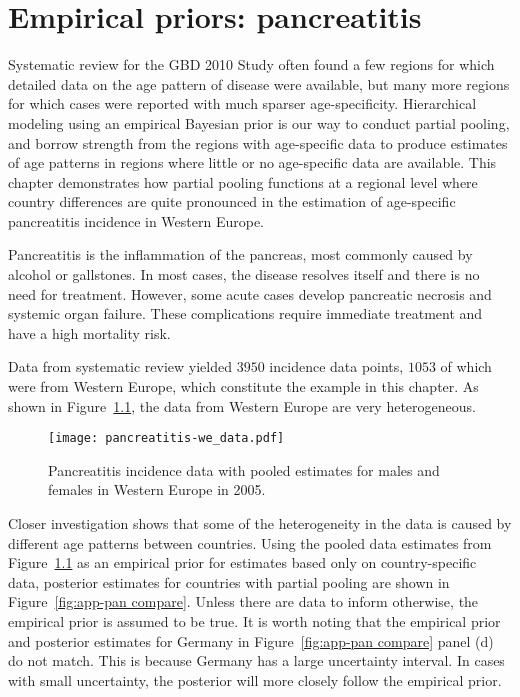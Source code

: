 \chapter{Empirical priors: pancreatitis}
\label{applications-priors_empirical}

Systematic review for the GBD 2010 Study often found a few regions for
which detailed data on the age pattern of disease were available, but
many more regions for which cases were reported with much sparser
age-specificity.  Hierarchical modeling using an empirical Bayesian
prior is our way to conduct partial pooling, and borrow strength from
the regions with age-specific data to produce estimates of age
patterns in regions where little or no age-specific data are available.
This chapter demonstrates how partial pooling functions at a regional level
where country differences are quite pronounced in the estimation of age-specific
pancreatitis incidence in Western Europe.

Pancreatitis is the inflammation of the pancreas, most commonly
caused by alcohol or gallstones.  In most cases, the disease resolves
itself and there is no need for treatment.  However, some acute
cases develop pancreatic necrosis and systemic organ failure.  These
complications require immediate treatment and have a high mortality risk.
\cite{raraty_acute_2004, banks_epidemiology_2002, sekimoto_JPN_2006}

Data from systematic review yielded $3950$ incidence data points,
$1053$ of which were from Western Europe, which constitute the example
in this chapter.  As shown in Figure~\ref{fig:app-pan data}, the data
from Western Europe are very heterogeneous.

    \begin{figure}[h]
        \begin{center}
            \texttt{[image: pancreatitis-we\_data.pdf]}
            \caption{Pancreatitis incidence data
              with pooled estimates for males and females in Western Europe in 2005.}
            \label{fig:app-pan data}
        \end{center}
    \end{figure}

Closer investigation shows that some of the heterogeneity in the data
is caused by different age patterns between countries.  
Using the pooled data estimates from
Figure~\ref{fig:app-pan data} as an empirical prior for estimates
based only on country-specific data, posterior estimates for countries
with partial pooling are shown in Figure~\ref{fig:app-pan compare}.  
Unless there are data to inform otherwise, the empirical
prior is assumed to be true.  It is worth noting that the empirical 
prior and posterior estimates for Germany in Figure~\ref{fig:app-pan compare} panel (d) 
do not match.  This is because Germany has a large uncertainty interval.  
In cases with small uncertainty, the posterior will more closely 
follow the empirical prior.

